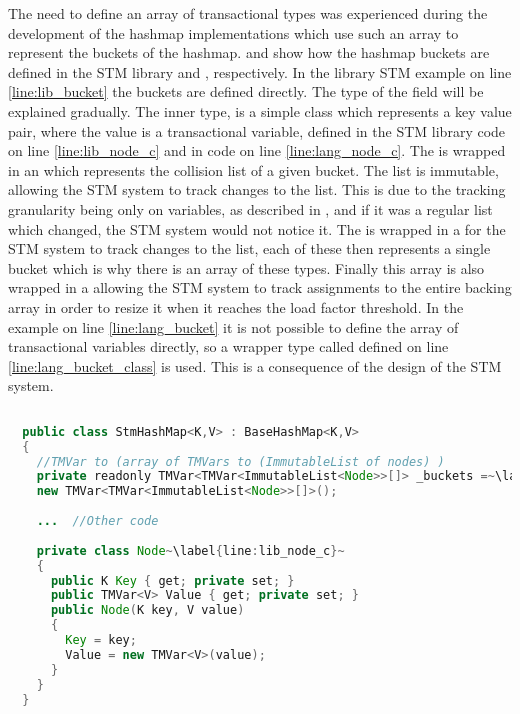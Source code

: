 The need to define an array of transactional types was experienced during the development of the hashmap implementations which use such an array to represent the buckets of the hashmap.  and  show how the hashmap buckets are defined in the \ac{STM} library and \stmname, respectively. In the library \ac{STM} example on line \ref{line:lib_bucket} the buckets are defined directly. The type of the  field will be explained gradually. The inner  type, is a simple class which represents a key value pair, where the value is a transactional variable, defined in the \ac{STM} library code on line \ref{line:lib_node_c} and in \stmname code on line \ref{line:lang_node_c}. The  is wrapped in an  which represents the collision list of a given bucket. The list is immutable, allowing the \ac{STM} system to track changes to the list. This is due to the tracking granularity being only on variables, as described in , and if it was a regular list which changed, the \ac{STM} system would not notice it. The  is wrapped in a  for the \ac{STM} system to track changes to the list, each of these then represents a single bucket which is why there is an array of these types. Finally this array is also wrapped in a  allowing the \ac{STM} system to track assignments to the entire backing array in order to resize it when it reaches the load factor threshold. In the \stmname example on line \ref{line:lang_bucket} it is not possible to define the array of transactional variables directly, so a wrapper type called  defined on line \ref{line:lang_bucket_class} is used. This is a consequence of the design of the \ac{STM} system.

\begin{lstlisting}[float,label=lst:lib_Buckets,
  caption={HashMap Buckets Array - \ac{STM} Library},
  language=Java,  
  showspaces=false,
  showtabs=false,
  breaklines=true,
  showstringspaces=false,
  breakatwhitespace=true,
  escapechar=~,
  commentstyle=\color{greencomments},
  keywordstyle=\color{bluekeywords},
  stringstyle=\color{redstrings},
  morekeywords={atomic, retry, orelse, var, get, set, ref, out, readonly}]  % Start your code-block
  
  public class StmHashMap<K,V> : BaseHashMap<K,V>
  {
    //TMVar to (array of TMVars to (ImmutableList of nodes) )
    private readonly TMVar<TMVar<ImmutableList<Node>>[]> _buckets =~\label{line:lib_bucket}~
    new TMVar<TMVar<ImmutableList<Node>>[]>();
  
    ...  //Other code
  
    private class Node~\label{line:lib_node_c}~
    {
      public K Key { get; private set; }
      public TMVar<V> Value { get; private set; }
      public Node(K key, V value)
      {
        Key = key;
        Value = new TMVar<V>(value);
      }
    }
  }
\end{lstlisting}

